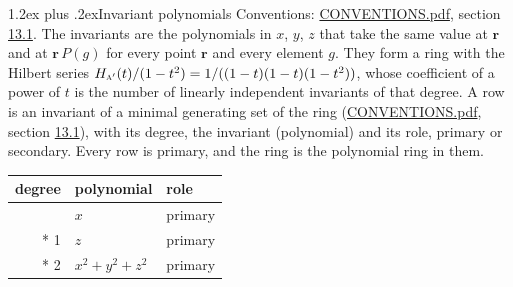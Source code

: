 \documentclass[10pt,a4paper]{article}
\makeatletter
\renewcommand\section{\@startsection{section}{1}{\z@}{-3ex plus -1ex minus -.2ex}%
  {1.2ex plus .2ex}{\normalfont\large\sffamily\bfseries\color{parttitle}}}
\numberwithin{equation}{section}
\newcommand{\irr}[1]{\text{\normalfont\scshape #1}}
\newcommand{\pointr}{\mathbf{r}}
\makeatother
\begin{document}
\section{Invariant polynomials}\label{s:invariant_polynomials}
Conventions: \href{../../CONVENTIONS.pdf}{CONVENTIONS.pdf}, section \href{../../CONVENTIONS.pdf\#conv.13.1}{13.1}.
The invariants are the polynomials in $x$, $y$, $z$ that take the same value at $\pointr$ and at $\pointr\,P(g)$ for every point $\pointr$ and every element $g$. They form a ring with the Hilbert series $H_{\irr{a}'}(t)/(1-t^{2}) = 1/((1-t)(1-t)(1-t^{2}))$, whose coefficient of a power of $t$ is the number of linearly independent invariants of that degree. \label{n:head.degree}\label{n:head.role}A row is an invariant of a minimal generating set of the ring (\href{../../CONVENTIONS.pdf}{CONVENTIONS.pdf}, section \href{../../CONVENTIONS.pdf\#conv.13.1}{13.1}), with its degree, the invariant (polynomial) and its role, primary or secondary. Every row is primary, and the ring is the polynomial ring in them.
{\small\begin{longtable}{@{}rll@{}}\toprule
degree & polynomial & role\\\midrule\endhead
\bottomrule\endfoot\endlastfoot
1 & $x$ & primary\\*
1 & $z$ & primary\\*
2 & $x^{2} + y^{2} + z^{2}$ & primary\\
\bottomrule\end{longtable}}
\end{document}
